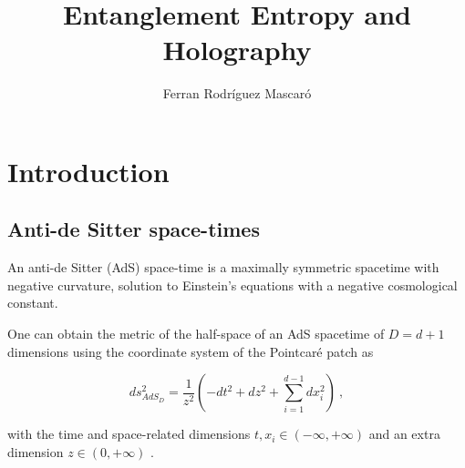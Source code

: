 \documentclass[lettersize,journal]{IEEEtran}
\title{Entanglement Entropy and Holography}
\author{Ferran Rodríguez Mascaró}
\date{}
\providecommand{\eq}[2]{
    \begin{equation}
        #2
    \label{eq:#1}
    \end{equation}
}
\begin{document}
\maketitle{}




\section{Introduction} \label{s:Intro}


\subsection{Anti-de Sitter space-times} \label{ss:AdS}

An anti-de Sitter (AdS) space-time is a maximally symmetric spacetime with negative curvature, solution to Einstein's equations with a negative cosmological constant.



One can obtain the metric of the half-space of an AdS spacetime of $D=d+1$ dimensions using the coordinate system of the Pointcaré patch as
\eq{AdS_PP-metric}{
    ds_{AdS_D}^2 = \frac{1}{z^2} \left( -dt^2 + dz^2 + \sum_{i=1}^{d-1} dx_i^2 \right) \ ,
}
with the time and space-related dimensions $t , x_i \in (-\infty,+\infty)$ and an extra dimension $z \in (0,+\infty)$ \cite{kaplan_lectures_nodate}.
\end{document}
